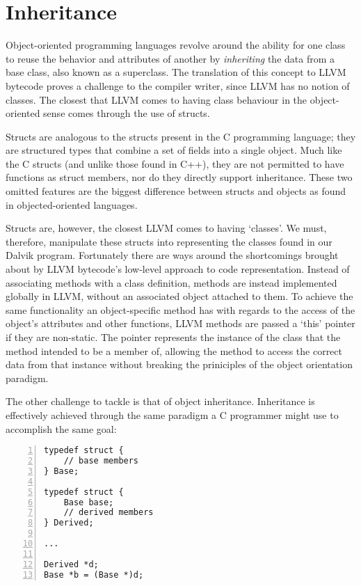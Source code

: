 \section{Inheritance}

Object-oriented programming languages revolve around the ability for one class to reuse the behavior and attributes of another by \textit{inheriting} the data from a base class, also known as a superclass. The translation of this concept to LLVM bytecode proves a challenge to the compiler writer, since LLVM has no notion of classes. The closest that LLVM comes to having class behaviour  in the object-oriented sense comes through the use of structs.

Structs are analogous to the structs present in the C programming language; they are structured types that combine a set of fields into a single object. Much like the C structs (and unlike those found in C++), they are not permitted to have functions as struct members, nor do they directly support inheritance. These two omitted features are the biggest difference between structs and objects as found in objected-oriented languages.

Structs are, however, the closest LLVM comes to having `classes'. We must, therefore, manipulate these structs into representing the classes found in our Dalvik program. Fortunately there are ways around the shortcomings brought about by LLVM bytecode's low-level approach to code representation. Instead of associating methods with a class definition, methods are instead implemented globally in LLVM, without an associated object attached to them. To achieve the same functionality an object-specific method has with regards to the access of the object's attributes and other functions, LLVM methods are passed a `this' pointer if they are non-static. The pointer represents the instance of the class that the method intended to be a member of, allowing the method to access the correct data from that instance without breaking the priniciples of the object orientation paradigm.

The other challenge to tackle is that of object inheritance. Inheritance is effectively achieved through the same paradigm a C programmer might use to accomplish the same goal:

\lstset{
	language=C,
	basicstyle=\small,
	stringstyle=\ttfamily
}

\begin{lstlisting}[frame=single, numbers=left, numberstyle=\tiny, title=C code]
typedef struct {
    // base members
} Base;

typedef struct {
    Base base;  
    // derived members   
} Derived;

...

Derived *d;
Base *b = (Base *)d;
\end{lstlisting}

